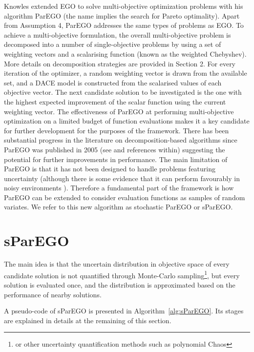 \documentclass[10pt]{llncs}
\begin{document}
Knowles \cite{Knowles2006ParEGO} extended EGO to solve multi-objective optimization problems with his algorithm ParEGO (the name implies the search for Pareto optimality). Apart from Assumption 4, ParEGO addresses the same types of problems as EGO. To achieve a multi-objective formulation, the overall multi-objective problem is decomposed into a number of single-objective problems by using a set of weighting vectors and a scalarising function (known as the weighted Chebyshev).
More details on decomposition strategies are provided in Section 2. For every iteration of the optimizer, a random weighting vector is drawn from the available set, and a DACE model is constructed from the scalarised values of each objective vector. The next candidate solution to be investigated is the one with the highest expected improvement of the scalar function using the current weighting vector.
The effectiveness of ParEGO at performing multi-objective optimization on a limited budget of function evaluations makes it a key candidate for further development for the purposes of the framework. There has been substantial progress in the literature on decomposition-based algorithms since ParEGO was published in 2005 (see \cite{giagkiozis2015overview} and references within) suggesting the potential for further improvements in performance. The main limitation of ParEGO is that it has not been designed to handle problems featuring uncertainty (although there is some evidence that it can perform favourably in noisy environments \cite{knowles2009noisy}). Therefore a fundamental part of the framework is how ParEGO can be extended to consider evaluation functions as samples of random variates. We refer to this new algorithm as stochastic ParEGO or sParEGO.

\section{sParEGO}
The main idea is that the uncertain distribution in objective space of every candidate solution is not quantified through Monte-Carlo sampling\footnote{or other uncertainty quantification methods such as polynomial Chaos}, but every solution is evaluated once, and the distribution is approximated based on the performance of nearby solutions.

A pseudo-code of sParEGO is presented in Algorithm~\ref{alg:sParEGO}.
Its stages are explained in details at the remaining of this section.
\end{document}
